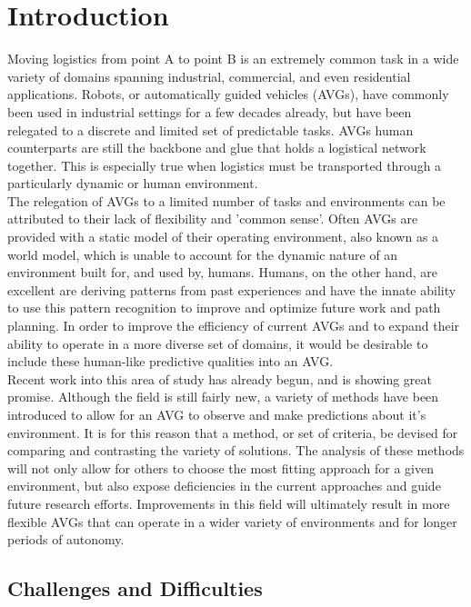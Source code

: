 
\chapter{ Introduction }

Moving logistics from point A to point B is an extremely common task in a
wide variety of domains spanning industrial, commercial, and even
residential applications. Robots, or automatically guided vehicles (AVGs),
have commonly been used in industrial settings for a few decades already,
but have been relegated to a discrete and limited set of predictable tasks.
AVGs human counterparts are still the backbone and glue that holds a
logistical network together. This is especially true when logistics must
be transported through a particularly dynamic or human environment.\\

The relegation of AVGs to a limited number of tasks and environments can
be attributed to their lack of flexibility and 'common sense'. Often AVGs
are provided with a static model of their operating environment, also
known as a world model, which is unable to account for the dynamic nature
of an environment built for, and used by, humans. Humans, on the other
hand, are excellent are deriving patterns from past experiences and have
the innate ability to use this pattern recognition to improve and optimize
future work and path planning. In order to improve the efficiency of
current AVGs and to expand their ability to operate in a more diverse set
of domains, it would be desirable to include these human-like predictive
qualities into an AVG.\\

Recent work into this area of study has already begun, and is showing great
promise. Although the field is still fairly new, a variety of methods have
been introduced to allow for an AVG to observe and make predictions about
it's environment. It is for this reason that a method, or set of criteria,
be devised for comparing and contrasting the variety of solutions. The
analysis of these methods will not only allow for others to choose the most
fitting approach for a given environment, but also expose deficiencies in
the current approaches and guide future research efforts. Improvements in
this field will ultimately result in more flexible AVGs that can operate
in a wider variety of environments and for longer periods of autonomy.


\section{ Challenges and Difficulties }

